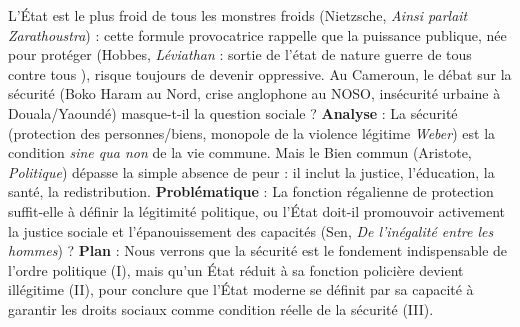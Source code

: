 \documentclass[11pt]{article}
\newcommand{\cle}[1]{{\popxbold\color{popdark}#1}}
\begin{document}
\begin{exoresolu}
    \guillemotleft L'État est le plus froid de tous les monstres froids \guillemotright (Nietzsche, \emph{Ainsi parlait Zarathoustra}) : cette formule provocatrice rappelle que la puissance publique, née pour protéger (Hobbes, \emph{Léviathan} : sortie de l'état de nature \guillemotleft guerre de tous contre tous \guillemotright), risque toujours de devenir oppressive. Au Cameroun, le débat sur la \cle{sécurité} (Boko Haram au Nord, crise anglophone au NOSO, insécurité urbaine à Douala/Yaoundé) masque-t-il la question sociale ? \textbf{Analyse} : La \cle{sécurité} (protection des personnes/biens, monopole de la violence légitime \emph{Weber}) est la condition \emph{sine qua non} de la vie commune. Mais le \cle{Bien commun} (Aristote, \emph{Politique}) dépasse la simple absence de peur : il inclut la justice, l'éducation, la santé, la \cle{redistribution}. \textbf{Problématique} : La fonction régalienne de protection suffit-elle à définir la légitimité politique, ou l'État doit-il promouvoir activement la justice sociale et l'épanouissement des capacités (Sen, \emph{De l'inégalité entre les hommes}) ? \textbf{Plan} : Nous verrons que la sécurité est le fondement indispensable de l'ordre politique (I), mais qu'un État réduit à sa fonction policière devient illégitime (II), pour conclure que l'État moderne se définit par sa capacité à garantir les \cle{droits sociaux} comme condition réelle de la sécurité (III).
\end{exoresolu}
\end{document}
